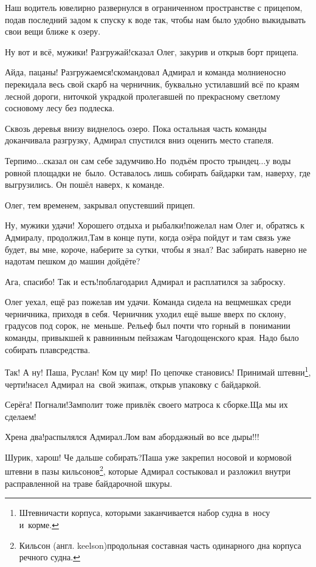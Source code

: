 Наш водитель ювелирно развернулся в ограниченном пространстве с прицепом, подав последний задом к спуску к воде так, чтобы нам было удобно выкидывать свои вещи ближе к озеру.

\diagdash Ну вот и всё, мужики! Разгружай!\mdash сказал Олег, закурив и открыв борт прицепа.

\diagdash Айда, пацаны! Разгружаемся!\mdash скомандовал Адмирал и команда молниеносно перекидала весь свой скарб на черничник, буквально устилавший всё по краям лесной дороги, ниточкой украдкой пролегавшей по прекрасному светлому сосновому лесу без подлеска. 

Сквозь деревья внизу виднелось озеро. Пока остальная часть команды доканчивала разгрузку, Адмирал спустился вниз оценить место стапеля. 

\diagdash Терпимо$\ldots$\mdash сказал он сам себе задумчиво.\mdash Но~подъём просто трындец$\ldots$\mdash у воды ровной площадки не~было. Оставалось лишь собирать байдарки там, наверху, где выгрузились. Он пошёл наверх, к команде.

Олег, тем временем, закрывал опустевший прицеп.

\diagdash Ну, мужики удачи! Хорошего отдыха и рыбалки!\mdash пожелал нам Олег и, обратясь к Адмиралу, продолжил,\mdash Там в конце пути, когда озёра пойдут и там связь уже будет, вы мне, короче, наберите за сутки, чтобы я знал? Вас забирать наверно не надо\mdash там пешком до машин дойдёте?

\diagdash Ага, спасибо! Так и есть!\mdash поблагодарил Адмирал и расплатился за заброску.

Олег уехал, ещё раз пожелав им удачи. Команда сидела на вещмешках среди черничника, приходя в себя. Черничник уходил ещё выше вверх по склону, градусов под сорок, не~меньше. Рельеф был почти что горный в~понимании команды, привыкшей к равнинным пейзажам Чагодощенского края. Надо было собирать плавсредства.

\diagdash Так! А ну! Паша, Руслан! Ком цу мир! По цепочке становись! Принимай штевни\footnote{Штевни\mdash части корпуса, которыми заканчивается набор судна в~носу и~корме.}, черти!\mdash насел Адмирал на~свой экипаж, открыв упаковку с байдаркой.

\diagdash Серёга! Погнали!\mdash Замполит тоже привлёк своего матроса к сборке.\mdash Ща мы их сделаем!

\diagdash Хрена два!\mdash распылялся Адмирал.\mdash Лом вам абордажный во все дыры!!! 

\renewcommand*{\thefootnote}{\arabic{footnote}}
\setcounter{footnote}{0} 
\diagdash Шурик, харош! Че дальше собирать?\mdash Паша уже закрепил носовой и кормовой штевни в пазы кильсонов\footnote{Кильсон (англ. keelson)\mdash продольная составная часть одинарного дна корпуса речного судна\cite{МорскойСправочник}.}, которые Адмирал состыковал и разложил внутри расправленной на траве байдарочной шкуры.

